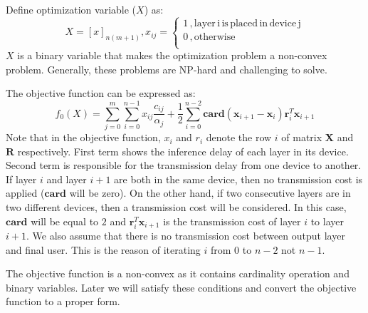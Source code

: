 \documentclass[lettersize,journal]{IEEEtran}
\begin{document}
Define optimization variable ($X$) as:
\begin{equation}
X = [x]_{n(m+1)}, x_{ij} = \begin{cases}
1 \, , \mathrm{layer \, i \, is \, placed \, in \, device \, j} \\
0 \, , \mathrm{otherwise} \\
\end{cases}
\end{equation}
$X$ is a binary variable that makes the optimization problem a non-convex problem. Generally, these problems are NP-hard and challenging to solve.

The objective function can be expressed as:
\begin{equation}
\label{obj_func}
f_0(X) = \sum_{j=0}^{m}\sum_{i=0}^{n-1} x_{ij}\frac{c_{ij}}{\alpha_j} + \frac{1}{2}\sum_{i=0}^{n-2}\mathrm{\textbf{card}}(\boldsymbol{x}_{i+1}-\boldsymbol{x}_i)\boldsymbol{r}_i^T \boldsymbol{x}_{i+1}
\end{equation}
Note that in the objective function, $x_i$ and $r_i$ denote the row $i$ of matrix $\boldsymbol{X}$ and $\boldsymbol{R}$ respectively. First term shows the inference delay of each layer in its device. Second term is responsible for the transmission delay from one device to another. If layer $i$ and layer $i+1$ are both in the same device, then no transmission cost is applied ($\mathrm{\textbf{card}}$ will be zero). On the other hand, if two consecutive layers are in two different devices, then a transmission cost will be considered. In this case, $\mathrm{\textbf{card}}$ will be equal to $2$ and $\boldsymbol{r}_i^T \boldsymbol{x}_{i+1}$ is the transmission cost of layer $i$ to layer $i+1$. We also assume that there is no transmission cost between output layer and final user. This is the reason of iterating $i$ from 0 to $n-2$ not $n-1$.

The objective function is a non-convex as it contains cardinality operation and binary variables. Later we will satisfy these conditions and convert the objective function to a proper form. 
\end{document}
